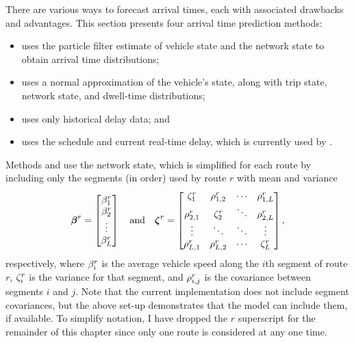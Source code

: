 There are various ways to forecast arrival times, each with associated drawbacks and advantages. This section presents four arrival time prediction methods:
\begin{itemize}
\item \Fpf{} uses the particle filter estimate of vehicle state and the network state to obtain arrival time distributions;
\item \Fnorm{} uses a normal approximation of the vehicle's state, along with trip state, network state, and dwell-time distributions;
\item \Fhist{} uses only historical delay data; and
\item \Fsched{} uses the schedule and current real-time delay, which is currently used by \AT{}.
\end{itemize}


Methods \Fpf{} and \Fnorm{} use the network state, which is simplified for each route by including only the segments (in order) used by route $r$ with mean and variance
\begin{equation}
\label{eq:route_nw_state}
\boldsymbol\beta^r =
\begin{bmatrix}
\beta^r_1 \\
\beta^r_2 \\
\vdots \\
\beta^r_L
\end{bmatrix}\quad\text{and}\quad
\boldsymbol{\zeta}^r =
\begin{bmatrix}
\zeta^r_{1} & \rho^r_{1,2} & \cdots &\rho^r_{1,L} \\
\rho^r_{2,1} & \zeta^r_{2} & \ddots &\rho^r_{2,L} \\
\vdots & \ddots & \ddots & \vdots \\
\rho^r_{L,1} & \rho^r_{L,2} & \cdots & \zeta^r_L
\end{bmatrix},
\end{equation}
respectively, where $\beta^r_{i}$ is the average vehicle speed along the $i$th segment of route $r$, $\zeta^r_{i}$ is the variance for that segment, and $\rho^r_{i,j}$ is the covariance between segments $i$ and $j$. Note that the current implementation does not include segment covariances, but the above set-up demonstrates that the model can include them, if available. To simplify notation, I have dropped the $r$ superscript for the remainder of this chapter since only one route is considered at any one time.

